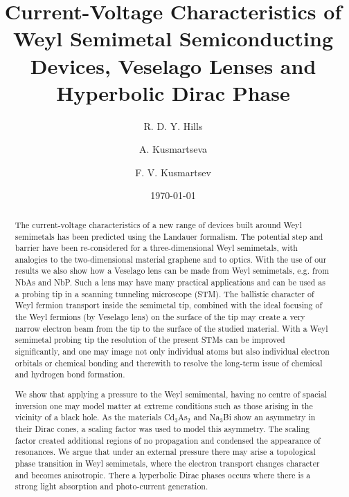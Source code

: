 \documentclass[prb,twocolumn,aps,superscriptaddress,showpacs,floatfix]{revtex4}
\begin{document}
\title{
Current-Voltage Characteristics of Weyl Semimetal Semiconducting Devices, Veselago Lenses and Hyperbolic Dirac Phase
}

\author{R. D. Y. Hills}

\author{A. Kusmartseva}

\author{F. V. Kusmartsev}

\date{\today}

\begin{abstract}
The current-voltage characteristics of a new range of devices built around Weyl semimetals has been predicted using the Landauer formalism. The potential step and barrier have been re-considered for a three-dimensional Weyl semimetals, with analogies to the two-dimensional material graphene and to optics.  With the use of our results we also show how a Veselago lens can be made from Weyl semimetals, e.g. from NbAs and NbP. Such a lens may have many practical applications and can be used as a probing tip in a scanning tunneling microscope (STM). The ballistic character of Weyl fermion transport inside the semimetal tip, combined with the ideal focusing of the Weyl fermions (by Veselago lens) on the surface of the tip may create a very narrow electron beam from the tip to the surface of the studied material. With a Weyl semimetal probing tip the resolution of the present STMs can be improved significantly, and one may image not only individual atoms but also individual electron orbitals or chemical bonding and therewith to resolve the long-term issue of chemical and hydrogen bond formation.

We show that applying a pressure to the Weyl semimental, having no centre of spacial inversion one may model matter at extreme conditions such as those arising in the vicinity of a black hole. As the materials Cd$_{3}$As$_{2}$ and Na$_{3}$Bi show an asymmetry in their Dirac cones, a scaling factor was used to model this asymmetry. The scaling factor created additional regions of no propagation and condensed the appearance of resonances. We argue that under an external pressure there may arise a topological phase transition in Weyl semimetals, where the electron transport changes character and becomes anisotropic. There a hyperbolic Dirac phases occurs where there is a strong light absorption and photo-current generation.
\end{abstract}
\end{document}
